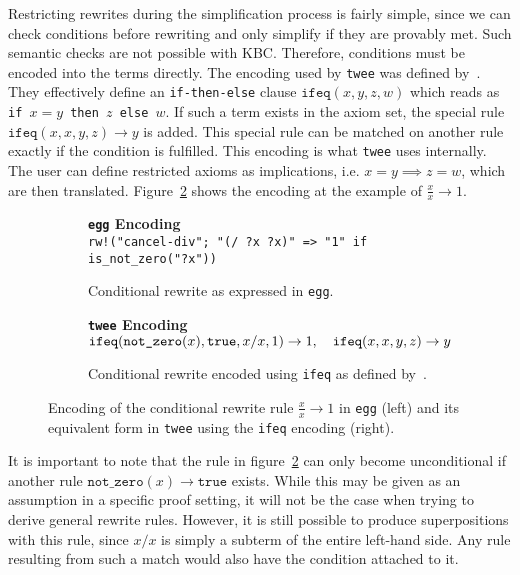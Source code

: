 Restricting rewrites during the simplification process is fairly simple, since we can check conditions before rewriting and only simplify if they are provably met. Such semantic checks are not possible with KBC. Therefore, conditions must be encoded into the terms directly. The encoding used by \texttt{twee} was defined by~\cite{ClaessenSmallbone2021}. They effectively define an \texttt{if-then-else} clause $\texttt{ifeq}(x, y , z, w)$ which reads as \texttt{if $x = y$ then $z$ else $w$}. If such a term exists in the axiom set, the special rule $\texttt{ifeq}(x, x , y, z) \to y$ is added. This special rule can be matched on another rule exactly if the condition is fulfilled. This encoding is what \texttt{twee} uses internally. The user can define restricted axioms as implications, i.e. $x=y \implies z = w$, which are then translated. Figure~\ref{fig:ifeq-twee} shows the encoding at the example of $\frac{x}{x} \to 1$. 

\begin{figure}[h]
	\centering
	\begin{subfigure}[t]{0.45\textwidth}
		\textbf{\texttt{egg} Encoding}\\[3pt]
		\texttt{rw!("cancel-div"; "(/ ?x ?x)" => "1" if is\_not\_zero("?x"))}
		\caption{\scriptsize Conditional rewrite as expressed in \texttt{egg}.}
		\label{fig:ifeq-egg}
	\end{subfigure}
	\hfill
	\begin{subfigure}[t]{0.45\textwidth}
		\textbf{\texttt{twee} Encoding}\\[3pt]
		$\displaystyle
		\text{\texttt{ifeq}}(\text{\texttt{not\_zero}}(x), \text{\texttt{true}}, x / x, 1) \to 1, \quad
		\text{\texttt{ifeq}}(x, x, y, z) \to y
		$
		\caption{\scriptsize Conditional rewrite encoded using \texttt{ifeq} as defined by~\cite{ClaessenSmallbone2021}.}
		\label{fig:ifeq-twee}
	\end{subfigure}
	
	\caption{Encoding of the conditional rewrite rule $\frac{x}{x} \to 1$ in \texttt{egg} (left) and its equivalent form in \texttt{twee} using the \texttt{ifeq} encoding (right).}
	\label{fig:ifeq-encoding}
\end{figure}


It is important to note that the rule in figure~\ref{fig:ifeq-twee} can only become unconditional if another rule $\texttt{not\_zero}(x) \to \texttt{true}$ exists. While this may be given as an assumption in a specific proof setting, it will not be the case when trying to derive general rewrite rules. However, it is still possible to produce superpositions with this rule, since $x/x$ is simply a subterm of the entire left-hand side. Any rule resulting from such a match would also have the condition attached to it.

